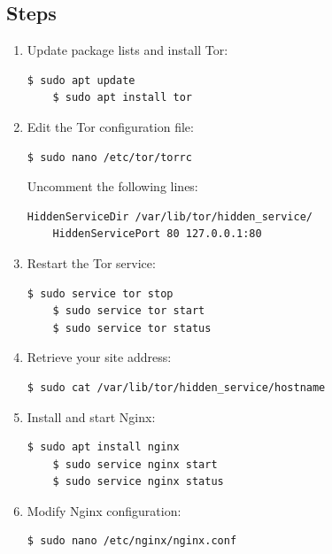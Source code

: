 \documentclass[a4paper,12pt]{article}
\begin{document}
\subsection{Steps}
\begin{enumerate}
    \item Update package lists and install Tor:
    \begin{lstlisting}[language=bash, breaklines=true, breakatwhitespace=true, columns=fullflexible]
    $ sudo apt update
    $ sudo apt install tor
    \end{lstlisting}

   \item Edit the Tor configuration file:
    \begin{lstlisting}[language=bash, breaklines=true, breakatwhitespace=true, columns=fullflexible]
    $ sudo nano /etc/tor/torrc
    \end{lstlisting}
    Uncomment the following lines:
    \begin{lstlisting}[language=bash, breaklines=true, breakatwhitespace=true, columns=fullflexible]
    HiddenServiceDir /var/lib/tor/hidden_service/
    HiddenServicePort 80 127.0.0.1:80
    \end{lstlisting}

    \item Restart the Tor service:
    \begin{lstlisting}[language=bash, breaklines=true, breakatwhitespace=true, columns=fullflexible]
    $ sudo service tor stop
    $ sudo service tor start
    $ sudo service tor status
    \end{lstlisting}

    \item Retrieve your site address:
    \begin{lstlisting}[language=bash, breaklines=true, breakatwhitespace=true, columns=fullflexible]
    $ sudo cat /var/lib/tor/hidden_service/hostname
    \end{lstlisting}

    \item Install and start Nginx:
    \begin{lstlisting}[language=bash, breaklines=true, breakatwhitespace=true, columns=fullflexible]
    $ sudo apt install nginx
    $ sudo service nginx start
    $ sudo service nginx status
    \end{lstlisting}

\item Modify Nginx configuration:
\begin{lstlisting}[language=bash, breaklines=true, breakatwhitespace=true, columns=fullflexible]
$ sudo nano /etc/nginx/nginx.conf
\end{lstlisting}


\end{enumerate}
\end{document}

